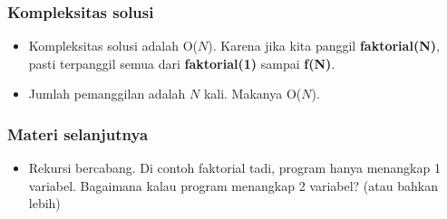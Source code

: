 \documentclass{beamer}
\begin{document}
\begin{frame}
\frametitle{Kompleksitas solusi}
\begin {itemize}
   \item Kompleksitas solusi adalah O($N$). Karena jika kita panggil \alert{\textbf{faktorial(N)}}, pasti terpanggil semua dari \alert{\textbf{faktorial(1)}} sampai \alert{\textbf{f(N)}}.
   \item Jumlah pemanggilan adalah $N$ kali. Makanya O($N$).
\end {itemize}
\end{frame}

\begin{frame}
\frametitle{Materi selanjutnya}
\begin{itemize}
   \item Rekursi bercabang. Di contoh faktorial tadi, program hanya menangkap 1 variabel. Bagaimana kalau program menangkap 2 variabel? (atau bahkan lebih)
\end {itemize}
\end{frame}
\end{document}
